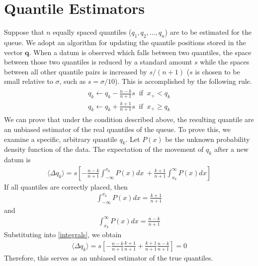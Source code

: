 \documentclass[conference]{IEEEtran}
\begin{document}
\section{Quantile Estimators}
Suppose that $n$ equally spaced quantiles ($q_{1},q_{2},...,q_{n}$) are to be estimated for the queue. We adopt an algorithm for updating the quantile positions stored in the vector $\boldsymbol{q}$. When a datum is observed which falls between two quantiles, the space between those two quantiles is reduced by a standard amount $s$ while the spaces between all other quantile pairs is increased by $s/(n+1)$ ($s$ is chosen to be small relative to $\sigma$, such as $s = \sigma / 10$). This is accomplished by the following rule.
\begin{align}
\begin{split}
q_{k} \leftarrow q_{k} - \frac{n-k}{n+1}s \ \text { if } \ x_{+} < q_{k} \\
q_{k} \leftarrow q_{k} + \frac{k+1}{n+1}s \ \text{ if } \ x_{+} \geq q_{k}
\end{split}
\end{align}
We can prove that under the condition described above, the resulting quantile are an unbiased estimator of the real quantiles of the queue. To prove this, we examine a specific, arbitrary quantile $q_{k}$. Let $P(x)$ be the unknown probability density function of the data. The expectation of the movement of $q_{k}$ after a new datum is
\begin{align}
\langle \Delta q_{k} \rangle = s \left[ -\frac{n-k}{n+1}\int_{-\infty}^{x_{k}}P(x)dx\ + \frac{k+1}{n+1}\int_{x_{k}}^{\infty}P(x)dx \right]
\label{integrals}
\end{align}
If all quantiles are correctly placed, then
\begin{align}
\int_{-\infty}^{x_{k}}P(x)dx = \frac{k+1}{n+1}
\end{align}
and
\begin{align}
\int_{x_{k}}^{\infty}P(x)dx = \frac{n-k}{n+1}
\end{align}
Substituting into \eqref{integrals}, we obtain
\begin{align}
\langle \Delta q_{k} \rangle = s \left[ -\frac{n-k}{n+1}\frac{k+1}{n+1} + \frac{k+1}{n+1}\frac{n-k}{n+1} \right]=0
\end{align}
Therefore, this serves as an unbiased estimator of the true quantiles.
\end{document}

